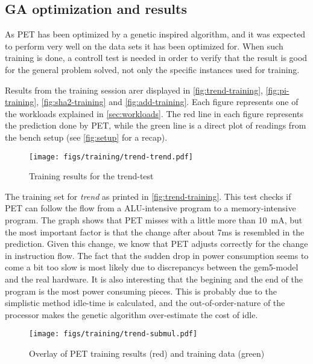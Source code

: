 \subsection{GA optimization and results}

As PET has been optimized by a genetic inspired algorithm, and it was expected
to perform very well on the data sets it has been optimized for. When such
training is done, a controll test is needed in order to verify that the result
is good for the general problem solved, not only the specific instances used for
training.


Results from the training session arer displayed in
\autoref{fig:trend-training}, \autoref{fig:pi-training},
\autoref{fig:sha2-training} and \autoref{fig:add-training}. Each figure
represents one of the workloads explained in \autoref{sec:workloads}.
The red line in each figure represents the prediction done by PET, while
the green line is a direct plot of readings from the bench setup (see \autoref{fig:setup} for a recap).

\begin{figure}[htb]
    \centering
    \texttt{[image: figs/training/trend-trend.pdf]}
    \caption{Training results for the trend-test}
    \label{fig:trend-training}
\end{figure}

The training set for \emph{trend} as printed in \autoref{fig:trend-training}.
This test checks if PET can follow the flow from a ALU-intensive program to a
memory-intensive program. The graph shows that PET misses with a little more
than 10~mA, but the most important factor is that the change after about 7ms is
resembled in the prediction. Given this change, we know that PET adjusts
correctly for the change in instruction flow. The fact that the sudden drop in
power consumption seems to come a bit too slow is most likely due to
discrepancys between the gem5-model and the real hardware. It is also
interesting that the begining and the end of the program is the most power
consuming pieces. This is probably due to the simplistic method idle-time is
calculated, and the out-of-order-nature of the processor makes the genetic
algorithm over-estimate the cost of idle.

\begin{figure}[htb]
    \centering
    \texttt{[image: figs/training/trend-submul.pdf]}
    \caption{Overlay of PET training results (red) and training data (green)}
    \label{fig:submul-training}
\end{figure}

